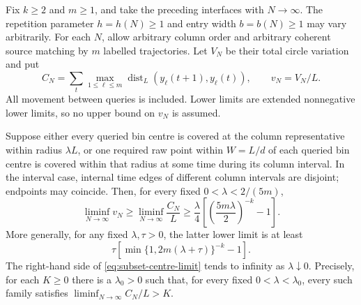 \begin{corollary}
\label{cor:subset-movement}
Fix $k\ge2$ and $m\ge1$, and take the preceding interfaces with
$N\to\infty$. The repetition parameter $h=h(N)\ge1$ and entry width
$b=b(N)\ge1$ may vary arbitrarily. For each $N$, allow arbitrary column
order and arbitrary coherent source matching by $m$ labelled trajectories.
Let $V_N$ be their total circle variation and put
\[
 C_N=\sum_t\max_{1\le\ell\le m}
        \operatorname{dist}_L(y_\ell(t+1),y_\ell(t)),
 \qquad v_N=V_N/L.
\]
All movement between queries is included. Lower limits are extended
nonnegative lower limits, so no upper bound on $v_N$ is assumed.

Suppose either every queried bin centre is covered at the column
representative within radius $\lambda L$, or one required raw point
within $W=L/d$ of each queried bin centre is covered within that radius
at some time during its column interval. In the interval case, internal
time edges of different column intervals are disjoint; endpoints may
coincide. Then, for every fixed $0<\lambda<2/(5m)$,
\begin{equation}
 \liminf_{N\to\infty}v_N
 \ge \liminf_{N\to\infty}\frac{C_N}{L}
 \ge\frac{\lambda}{4}
      \left[\left(\frac{5m\lambda}{2}\right)^{-k}-1\right].
 \label{eq:subset-centre-limit}
\end{equation}
More generally, for any fixed $\lambda,\tau>0$, the latter lower limit
is at least
\[
 \tau\left[\min\{1,2m(\lambda+\tau)\}^{-k}-1\right].
\]
The right-hand side of \cref{eq:subset-centre-limit} tends to infinity
as $\lambda\downarrow0$. Precisely, for each $K\ge0$ there is a
$\lambda_0>0$ such that, for every fixed $0<\lambda<\lambda_0$, every
such family satisfies $\liminf_{N\to\infty}C_N/L>K$.
\end{corollary}

